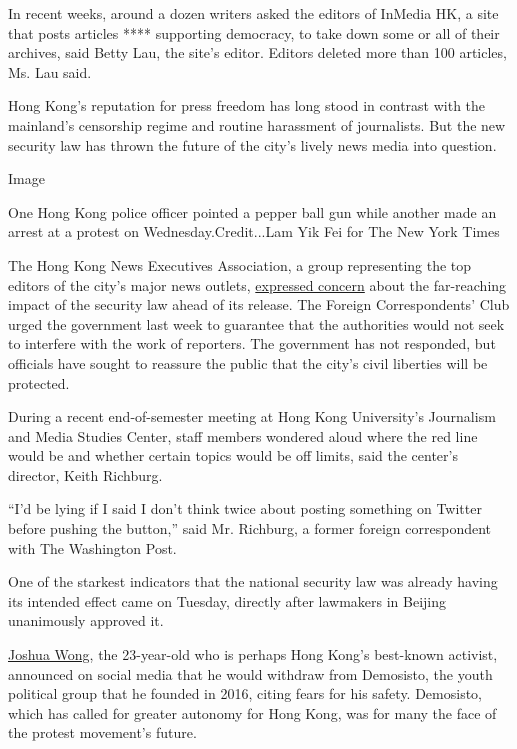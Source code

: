 In recent weeks, around a dozen writers asked the editors of InMedia HK,
a site that posts articles **** supporting democracy, to take down some
or all of their archives, said Betty Lau, the site's editor. Editors
deleted more than 100 articles, Ms. Lau said.

Hong Kong's reputation for press freedom has long stood in contrast with
the mainland's censorship regime and routine harassment of journalists.
But the new security law has thrown the future of the city's lively news
media into question.

Image

One Hong Kong police officer pointed a pepper ball gun while another
made an arrest at a protest on Wednesday.Credit...Lam Yik Fei for The
New York Times

The Hong Kong News Executives Association, a group representing the top
editors of the city's major news outlets,
\href{https://www.scmp.com/news/hong-kong/law-and-crime/article/3090787/hong-kong-national-security-law-citys-media-bosses}{expressed
concern} about the far-reaching impact of the security law ahead of its
release. The Foreign Correspondents' Club urged the government last week
to guarantee that the authorities would not seek to interfere with the
work of reporters. The government has not responded, but officials have
sought to reassure the public that the city's civil liberties will be
protected.

During a recent end-of-semester meeting at Hong Kong University's
Journalism and Media Studies Center, staff members wondered aloud where
the red line would be and whether certain topics would be off limits,
said the center's director, Keith Richburg.

``I'd be lying if I said I don't think twice about posting something on
Twitter before pushing the button,'' said Mr. Richburg, a former foreign
correspondent with The Washington Post.

One of the starkest indicators that the national security law was
already having its intended effect came on Tuesday, directly after
lawmakers in Beijing unanimously approved it.

\href{https://www.nytimes3xbfgragh.onion/2014/10/02/world/asia/hong-kong-china-democracy-protests-students.html}{Joshua
Wong}, the 23-year-old who is perhaps Hong Kong's best-known activist,
announced on social media that he would withdraw from Demosisto, the
youth political group that he founded in 2016, citing fears for his
safety. Demosisto, which has called for greater autonomy for Hong Kong,
was for many the face of the protest movement's future.

